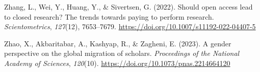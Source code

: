 \documentclass[a4paper,man,floatsintext,longtable,noextraspace,12pt]{apa6}
\newenvironment{CSLReferences}%
  {}%
  {\par}
\begin{document}
\begin{CSLReferences}{1}{0}
\leavevmode{}%
Zhang, L., Wei, Y., Huang, Y., \& Sivertsen, G. (2022). Should open
access lead to closed research? The trends towards paying to perform
research. \emph{Scientometrics}, \emph{127}(12), 7653--7679.
\url{https://doi.org/10.1007/s11192-022-04407-5}

\leavevmode{}%
Zhao, X., Akbaritabar, A., Kashyap, R., \& Zagheni, E. (2023). A gender
perspective on the global migration of scholars. \emph{Proceedings of
the National Academy of Sciences}, \emph{120}(10).
\url{https://doi.org/10.1073/pnas.2214664120}

\end{CSLReferences}
\end{document}
